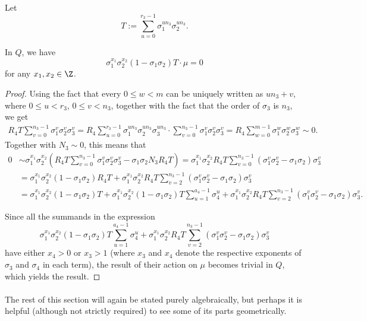 Let $$T:=\sum_{u=0}^{r_3-1}\sigma_1^{un_3}\sigma_2^{un_3}.$$

\begin{lemma}\label{Tdiag}
In $Q$, we have $$\sigma_1^{x_1}\sigma_2^{x_2}(1-\sigma_1\sigma_2)T\cdot \mu=0$$
for any $x_1,x_2\in\Z$.
\end{lemma}
\begin{proof}
Using the fact that every $0\leq w<m$ can be uniquely written as $un_3+v$, where $0\leq u<r_3$, $0\leq v<n_3$, together with the fact that the order of $\sigma_3$ is $n_3$, we get 
\begin{align*}
R_4T\sum_{v=0}^{n_3-1}\sigma_1^{v}\sigma_2^{v}\sigma_3^{v}=R_4\sum_{u=0}^{r_3-1}\sigma_1^{un_3}\sigma_2^{un_3}\sigma_3^{un_3}\cdot \sum_{v=0}^{n_3-1}\sigma_1^{v}\sigma_2^{v}\sigma_3^{v}=R_4\sum_{w=0}^{m-1}\sigma_1^{w}\sigma_2^{w}\sigma_3^{w}\sim 0.
\end{align*}
Together with $N_3\sim 0$, this means that 
\begin{align*}
0&\sim \sigma_1^{x_1}\sigma_2^{x_2}\left(R_4T \sum_{v=0}^{n_3-1}\sigma_1^{v}\sigma_2^{v}\sigma_3^{v}-\sigma_1\sigma_2N_3R_4T\right)=\sigma_1^{x_1}\sigma_2^{x_2}R_4T\sum_{v=0}^{n_3-1}\left(\sigma_1^{v}\sigma_2^{v}-\sigma_1\sigma_2\right)\sigma_3^{v}\\
&=\sigma_1^{x_1}\sigma_2^{x_2}(1-\sigma_1\sigma_2)R_4T+\sigma_1^{x_1}\sigma_2^{x_2}R_4T\sum_{v=2}^{n_3-1}\left(\sigma_1^{v}\sigma_2^{v}-\sigma_1\sigma_2\right)\sigma_3^{v}\\
&=\sigma_1^{x_1}\sigma_2^{x_2}(1\!-\!\sigma_1\sigma_2)T\!+\!
\sigma_1^{x_1}\sigma_2^{x_2}(1\!-\!\sigma_1\sigma_2)T\sum_{u=1}^{a_4-1}\sigma_4^u\!+\!\sigma_1^{x_1}\sigma_2^{x_2}R_4T\sum_{v=2}^{n_3-1}\left(\sigma_1^{v}\sigma_2^{v}-\sigma_1\sigma_2\right)\sigma_3^{v}.
\end{align*}

Since all the summands in the expression $$\sigma_1^{x_1}\sigma_2^{x_2}(1-\sigma_1\sigma_2)T\sum_{u=1}^{a_4-1}\sigma_4^u+\sigma_1^{x_1}\sigma_2^{x_2}R_4T\sum_{v=2}^{n_3-1}\left(\sigma_1^{v}\sigma_2^{v}-\sigma_1\sigma_2\right)\sigma_3^{v}$$
have either $x_4>0$ or $x_3>1$ (where $x_3$ and $x_4$ denote the respective exponents of $\sigma_3$ and $\sigma_4$ in each term), the result of their action on $\mu$ becomes trivial in $Q$, which yields the result.
\end{proof}
\paragraph*{}
The rest of this section will again be stated purely algebraically, but perhaps it is helpful (although not strictly required) to see some of its parts geometrically.

